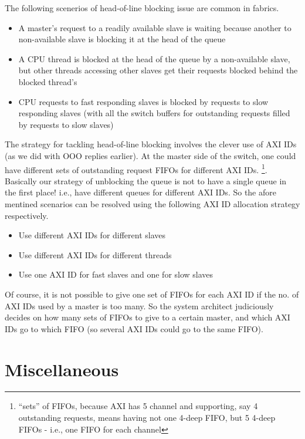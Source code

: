 The following scenerios of head-of-line blocking issue are common in fabrics.
	\begin{itemize}
	\item A master's request to a readily available slave is waiting because another to non-available slave is blocking it at the head of the queue
	\item A CPU thread is blocked at the head of the queue by a non-available slave, but other threads accessing other slaves get their requests blocked behind the blocked thread's
	\item CPU requests to fast responding slaves is blocked by requests to slow responding slaves (with all the switch buffers for outstanding requests filled by requests to slow slaves)
	\end{itemize}

The strategy for tackling head-of-line blocking involves the clever use of AXI IDs (as we did with OOO replies earlier). At the master side of the switch, one could have different sets of outstanding request FIFOs for different AXI IDs. \footnote{``sets'' of FIFOs, because AXI has 5 channel and supporting, say 4 outstanding requests, means having not one 4-deep FIFO, but 5 4-deep FIFOs - i.e., one FIFO for each channel}. Basically our strategy of unblocking the queue is not to have a single queue in the first place! i.e., have different queues for different AXI IDs. So the afore mentined scenarios can be resolved using the following AXI ID allocation strategy respectively.
	\begin{itemize}
	\item Use different AXI IDs for different slaves
	\item Use different AXI IDs for different threads
	\item Use one AXI ID for fast slaves and one for slow slaves
	\end{itemize}
	
Of course, it is not possible to give one set of FIFOs for each AXI ID if the no. of AXI IDs used by a master is too many. So the system architect judiciously decides on how many sets of FIFOs to give to a certain master, and which AXI IDs go to which FIFO (so several AXI IDs could go to the same FIFO). 
	
\chapter{Miscellaneous}
\label{chap:partSysMisc}
